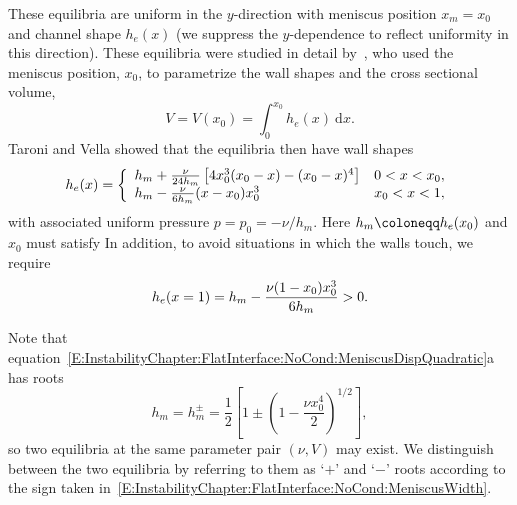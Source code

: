 These equilibria are uniform in the $y$-direction with meniscus position $x_m = x_0$ and channel shape $h_e(x)$ (we suppress the $y$-dependence to reflect uniformity in this direction). These equilibria were studied in detail by~\cite{Taroni2012JFM}, who used the meniscus position, $x_0$, to parametrize the wall shapes and the cross sectional volume,
\begin{equation}
V  = V(x_0) = \int_{0}^{x_0} h_e(x)~\mathrm{d}x.
\end{equation}
Taroni and Vella showed that the equilibria then have wall shapes
\begin{equation}\label{E:InstabilityChapter:FlatInterface:NoCond:EqShape}
h_e(x) = \left\{\begin{array}{l l}
 h_m+ \frac{\nu}{24 h_m}\left[4 x_0^3( x_0 - x) - ( x_0 - x)^4\right] &  0 < x <  x_0, \\
 h_m -\frac{\nu }{6 h_m}(x - x_0) x_0^3 & x_0 < x < 1,
\end{array}\right.
\end{equation}
with associated uniform pressure $p = p_0 = -\nu/h_m$. Here $h_m \coloneqq  \h_e(\x_0)$ and $x_0$ must satisfy
In addition, to avoid situations in which the walls touch, we require
\begin{equation}\label{E:InstabilityChapter:FlatInterface:NoCond:NoTouchCond}
h_e(x = 1) = h_m - \frac{\nu  (1- x_0 )x_0^3}{6 h_m} > 0.
\end{equation}

Note that equation~\eqref{E:InstabilityChapter:FlatInterface:NoCond:MeniscusDispQuadratic}a has roots
\begin{equation}\label{E:InstabilityChapter:FlatInterface:NoCond:MeniscusWidth}
h_m = h_m^{\pm} = \frac{1}{2}\left[ 1 \pm \left(1 - \frac{\nu x_0^4}{2}\right)^{1/2}\right],
\end{equation}
so two equilibria at the same parameter pair $(\nu , V)$ may exist. We distinguish between the two equilibria by referring to them as `$+$' and `$-$' roots according to the sign taken in~\eqref{E:InstabilityChapter:FlatInterface:NoCond:MeniscusWidth}.

